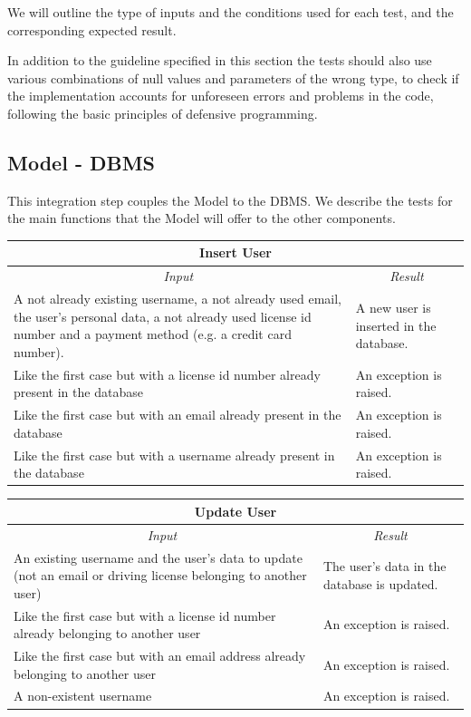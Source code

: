 \documentclass[english]{article}
\begin{document}
We will outline the type of inputs and the conditions used for each test, and the corresponding expected result.

In addition to the guideline specified in this section the tests should also use various combinations of null values and parameters of the wrong type, to check if the implementation accounts for unforeseen errors and problems in the code, following the basic principles of defensive programming.

\subsection{Model - DBMS}

This integration step couples the Model to the DBMS. We describe the tests for the main functions that the Model will offer to the other components.

\begin{center}
	\begin{tabular}{ | p{6cm} | p{6cm} | }
		\hline 
		\multicolumn{2}{|c|}{\textbf{Insert User}} \\
		\hline
		\multicolumn{1}{|c|}{\textit{Input}} & \multicolumn{1}{c|}{\textit{Result}} \\
		\hline
		A not already existing username, a not already used email, the user's personal data, a not already used license id number and a payment method (e.g. a credit card number). & A new user is inserted in the database. \\
		\hline
		Like the first case but with a license id number already present in the database & An exception is raised. \\
		\hline
		Like the first case but with an email already present in the database & An exception is raised. \\
		\hline
		Like the first case but with a username already present in the database & An exception is raised. \\
		\hline
	\end{tabular}
\end{center}
\begin{center}
	\begin{tabular}{ | p{6cm} | p{6cm} | }
		\hline 
		\multicolumn{2}{|c|}{\textbf{Update User}} \\
		\hline
		\multicolumn{1}{|c|}{\textit{Input}} & \multicolumn{1}{c|}{\textit{Result}} \\
		\hline
		An existing username and the user's data to update (not an email or driving license belonging to another user)  & The user's data in the database is updated. \\
		\hline
		Like the first case but with a license id number already belonging to another user & An exception is raised. \\
		\hline
		Like the first case but with an email address already belonging to another user & An exception is raised. \\
		\hline
		A non-existent username & An exception is raised. \\
		\hline
	\end{tabular}
\end{center}
\end{document}

